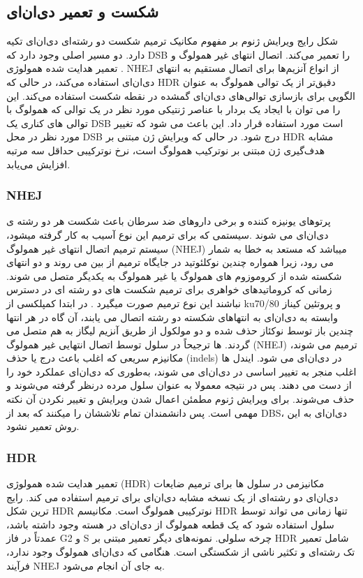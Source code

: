 \documentclass[12pt,a4paper,BCOR=.7cm,headsepline,bibliography=totoc]{report}
\begin{document}
\subsection{ شکست و تعمیر دی‌ان‌ای}
شکل رایج ویرایش ژنوم بر مفهوم مکانیک ترمیم شکست دو رشته‌ای دی‌ان‌ای
تکیه دارد. دو مسیر اصلی وجود دارد که DSB را تعمیر می‌کند. اتصال انتهای غیر همولوگ
  و تعمیر هدایت شده همولوژی
   . NHEJ از انواع آنزیم‌ها برای اتصال مستقیم به انتهای دی‌ان‌ای استفاده می‌کند، در حالی که HDR دقیق‌تر از یک توالی همولوگ به عنوان الگویی برای بازسازی توالی‌های دی‌ان‌ای گمشده در نقطه شکست استفاده می‌کند. این را می توان با ایجاد یک بردار با عناصر ژنتیکی مورد نظر در یک توالی که همولوگ با توالی های کناری یک DSB است مورد استفاده قرار داد. این باعث می شود که تغییر مورد نظر در محل DSB درج شود. در حالی که ویرایش ژن مبتنی بر HDR مشابه هدف‌گیری ژن مبتنی بر نوترکیب همولوگ است، نرخ نوترکیبی حداقل سه مرتبه افزایش می‌یابد.
\subsubsection{NHEJ}

پرتوهای یونیزه کننده و برخی داروهای ضد سرطان باعث شکست هر دو رشته ی دی‌ان‌ای می شوند .سیستمی که برای ترمیم این نوع آسیب به کار گرفته میشود، سیستم ترمیم اتصال انتهای غیر همولوگ (NHEJ) میباشد که مستعد به خطا به شمار می رود، زیرا همواره چندین نوکلئوتید در جایگاه ترمیم از بین می روند و دو انتهای شکسته شده از کروموزوم های همولوگ یا غیر همولوگ به یکدیگر متصل می شوند.
زمانی که کروماتیدهای خواهری برای ترمیم شکست های دو رشته ای در دسترس نباشند این نوع ترمیم صورت میگیرد . در ابتدا کمپلکسی از ku70/80 و پروتئین کیناز وابسته به دی‌ان‌ای به انتهاهای شکسته دو رشته اتصال می یابند، آن گاه در هر انتها چندین باز توسط نوکئاز حذف شده و دو مولکول از طریق آنزیم لیگاز به هم متصل می گردند. 
ها
 ترجیحاً در سلول توسط اتصال انتهایی غیر همولوگ (NHEJ) ترمیم می شوند، مکانیزم سریعی که اغلب باعث درج یا حذف (indels) در دی‌ان‌ای می شود. ایندل ها اغلب منجر به تغییر اساسی در دی‌ان‌ای می شوند، به‌طوری که دی‌ان‌ای عملکرد خود را از دست می دهند. پس در نتیجه معمولا به عنوان سلول مرده درنظر گرفته می‌شوند و حذف می‌شوند. برای ویرایش ژنوم مطمئن اعمال شدن ویرایش و تغییر نکردن آن نکته مهمی است. پس دانشمندان تمام تلاششان را میکنند که بعد از DBS، دی‌ان‌ای به این روش تعمیر نشود.
\subsubsection{HDR}
 تعمیر هدایت شده همولوژی (HDR) مکانیزمی در سلول ها برای ترمیم ضایعات دی‌ان‌ای دو رشته‌ای از یک نسخه مشابه دی‌ان‌ای برای ترمیم استفاده می کند. رایج ترین شکل HDR نوترکیبی همولوگ است. مکانیسم HDR تنها زمانی می تواند توسط سلول استفاده شود که یک قطعه همولوگ از دی‌ان‌ای در هسته وجود داشته باشد، عمدتاً در فاز G2 و S چرخه سلولی. نمونه‌های دیگر تعمیر مبتنی بر HDR شامل تعمیر تک رشته‌ای و تکثیر ناشی از شکستگی است. هنگامی که دی‌ان‌ای همولوگ وجود ندارد، فرآیند NHEJ به جای آن انجام می‌شود.
\end{document}
